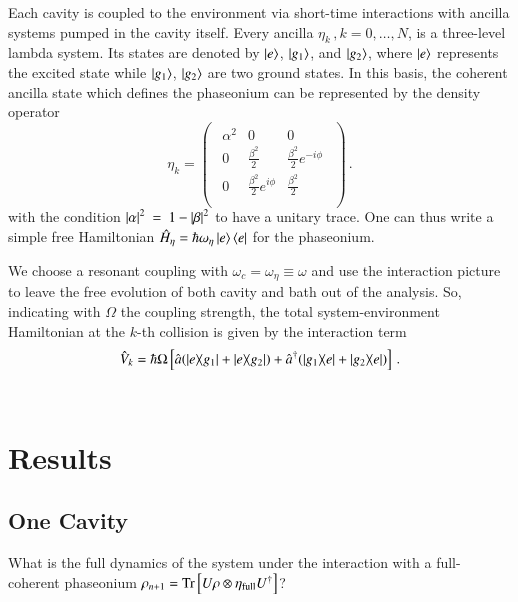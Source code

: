 \documentclass[]{article}
\renewcommand{\a}{\hat{a}}
\newcommand{\ad}{\hat{a}^\dagger}
\begin{document}
Each cavity is coupled to the environment via short-time interactions with ancilla systems pumped in the cavity itself. 
Every ancilla $\eta_k\,,k=0,\ldots,N$, is a three-level lambda system. Its states are denoted by $\ket{e}$, $\ket{g_1}$, and $\ket{g_2}$, where $\ket{e}$ represents the excited state while $\ket{g_1}$, $\ket{g_2}$ are two ground states. 
In this basis, the coherent ancilla state which defines the phaseonium \cite{scully_extracting-work_2002} can be represented by the density operator
\begin{equation}
\label{def:ancilla-state}
    \eta_k = 
\begin{pmatrix}
\begin{array}{ccc}
    \alpha^2 & 0 & 0
\\
    0 & \frac{\beta^2}{2} & \frac{\beta^2}{2} e^{-i \phi} 
\\[.3em]
    0 & \frac{\beta^2}{2}  e^{i \phi } & \frac{\beta^2}{2} \\
\end{array}
\end{pmatrix}
\,.\end{equation}
with the condition $\abs{\alpha}^2~=~1-\abs{\beta}^2$ to have a unitary trace.
One can thus write a simple free Hamiltonian $\hat{H}_\eta = \hbar\omega_\eta\ket{e}\bra{e}$ for the phaseonium.

We choose a resonant coupling with $\omega_c = \omega_\eta \equiv \omega$ and use the interaction picture to leave the free evolution of both cavity and bath out of the analysis.
So, indicating with $\Omega$ the coupling strength, the total system-environment Hamiltonian at the $k$-th collision is given by the interaction term
\begin{equation}\label{def:interaction}
    \hat{V}_k = \hbar\Omega\left[ \a(\dyad{e}{g_1}+\dyad{e}{g_2}) + \ad(\dyad{g_1}{e}+\dyad{g_2}{e}) \right] \,.
\end{equation}
\\

\section{Results}

\subsection{One Cavity}
What is the full dynamics of the system under the interaction with a full-coherent phaseonium $\rho_{n+1}=\Tr\left[U\rho\otimes\eta_{\text{full}}U^\dagger\right]$?
\end{document}
